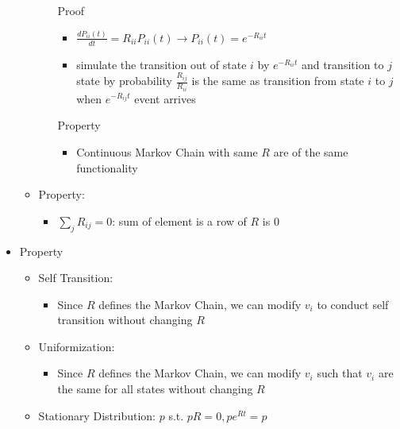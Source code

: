 \documentclass[a4paper]{article}
\begin{document}
\begin{itemize}
\begin{itemize}
\begin{itemize}
                        Proof
                        \begin{itemize}
                            \item $\frac{d P_{ii}(t)}{dt} = R_{ii} P_{ii}(t) \rightarrow P_{ii}(t) = e^{-R_{ii}t}$
                            \item simulate the transition out of state $i$ by $e^{-R_{ii}t}$ and transition to $j$ state by probability $\frac{R_{ij}}{R_{ii}}$ is the same as transition from state $i$ to $j$ when $e^{-R_{ij}t}$ event arrives
                        \end{itemize}
                        Property
                        \begin{itemize}
                            \item Continuous Markov Chain with same $R$ are of the same functionality
                        \end{itemize}
                \end{itemize}
            \item Property:
                \begin{itemize}
                    \item $\sum_j R_{ij} = 0$: sum of element is a row of $R$ is 0
                \end{itemize}
        \end{itemize}
    \item Property
        \begin{itemize}
            \item Self Transition:
                \begin{itemize}
                    \item Since $R$ defines the Markov Chain, we can modify $v_i$ to conduct self transition without changing $R$
                \end{itemize}
            \item Uniformization:
                \begin{itemize}
                    \item Since $R$ defines the Markov Chain, we can modify $v_i$ such that $v_i$ are the same for all states without changing $R$
                \end{itemize}
            \item Stationary Distribution: $p$ s.t. $pR = 0, pe^{Rt} = p$


\end{itemize}
\end{itemize}
\end{document}
